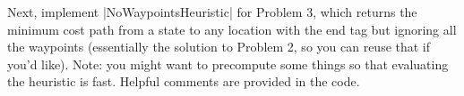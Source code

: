 \item {}

Next, implement |NoWaypointsHeuristic| for Problem 3, which returns the minimum cost path from a state to any location with the end tag but ignoring all the waypoints (essentially the solution to Problem 2, so you can reuse that if you'd like). Note: you might want to precompute some things so that evaluating the heuristic is fast. Helpful comments are provided in the code.

